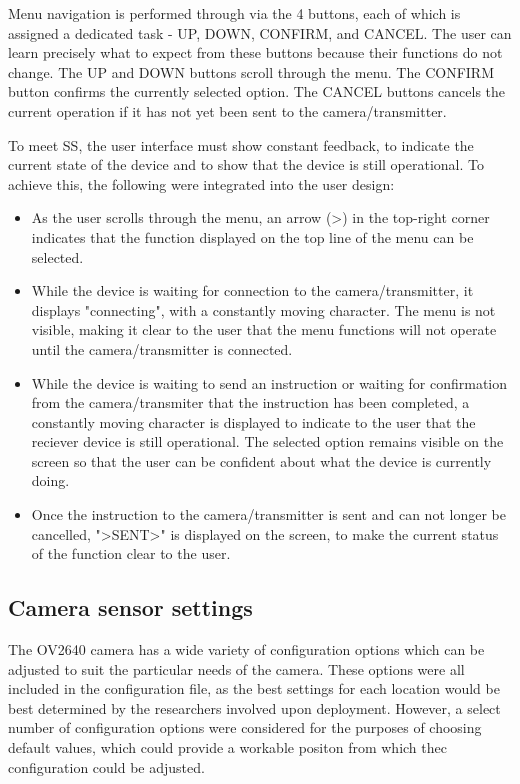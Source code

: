 \documentclass[class=report,11pt,crop=false]{standalone}
\begin{document}
Menu navigation is performed through via the 4 buttons, each of which is assigned a dedicated task - UP, DOWN, CONFIRM, and CANCEL. The user can learn precisely what to expect from these buttons because their functions do not change. The UP and DOWN buttons scroll through the menu. The CONFIRM button confirms the currently selected option. The CANCEL buttons cancels the current operation if it has not yet been sent to the camera/transmitter.

To meet SS, the user interface must show constant feedback, to indicate the current state of the device and to show that the device is still operational. To achieve this, the following were integrated into the user design:

\begin{itemize}
    \item As the user scrolls through the menu, an arrow (>) in the top-right corner indicates that the function displayed on the top line of the menu can be selected.
    \item While the device is waiting for connection to the camera/transmitter, it displays "connecting", with a constantly moving character. The menu is not visible, making it clear to the user that the menu functions will not operate until the camera/transmitter is connected.
    \item While the device is waiting to send an instruction or waiting for confirmation from the camera/transmiter that the instruction has been completed, a constantly moving character is displayed to indicate to the user that the reciever device is still operational. The selected option remains visible on the screen so that the user can be confident about what the device is currently doing.
    \item Once the instruction to the camera/transmitter is sent and can not longer be cancelled, ">SENT>" is displayed on the screen, to make the current status of the function clear to the user.
\end{itemize}

\subsection{Camera sensor settings}

The OV2640 camera has a wide variety of configuration options which can be adjusted to suit the particular needs of the camera. These options were all included in the configuration file, as the best settings for each location would be best determined by the researchers involved upon deployment. However, a select number of configuration options were considered for the purposes of choosing default values, which could provide a workable positon from which thec configuration could be adjusted. 
\end{document}
